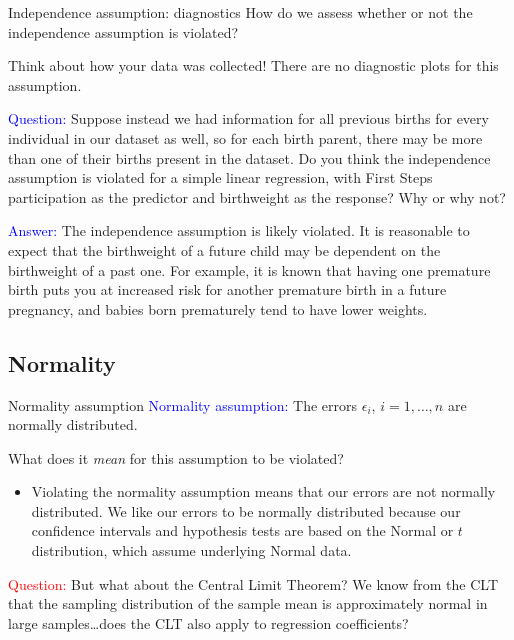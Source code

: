\documentclass[10pt,t]{beamer}
\begin{document}
\begin{frame}{Independence assumption: diagnostics}
How do we assess whether or not the independence assumption is violated?

\vspace{0.3cm}

Think about how your data was collected! There are no diagnostic plots for this assumption.

\vspace{0.3cm}

\textcolor{blue}{Question:} Suppose instead we had information for all previous births for every individual in our dataset as well, so for each birth parent, there may be more than one of their births present in the dataset. Do you think the independence assumption is violated for a simple linear regression, with First Steps participation as the predictor and birthweight as the response? Why or why not? \pause

\vspace{0.3cm}

\textcolor{blue}{Answer:} The independence assumption is likely violated. It is reasonable to expect that the birthweight of a future child may be dependent on the birthweight of a past one. For example, it is known that having one premature birth puts you at increased risk for another premature birth in a future pregnancy, and babies born prematurely tend to have lower weights. 

\end{frame}

\subsection{Normality}

\begin{frame}{Normality assumption}
\textcolor{blue}{Normality assumption:} The errors $\epsilon_i$, $i = 1, \dots, n$ are normally distributed.

\vspace{0.3cm}

What does it \textit{mean} for this assumption to be violated?

\vspace{0.3cm}

\begin{itemize}
	\item[] Violating the normality assumption means that our errors are not normally distributed. We like our errors to be normally distributed because our confidence intervals and hypothesis tests are based on the Normal or $t$ distribution, which assume underlying Normal data. \pause
\end{itemize}

\vspace{0.3cm} 
\textcolor{red}{Question:} But what about the Central Limit Theorem? We know from the CLT that the sampling distribution of the sample mean is approximately normal in large samples\dots does the CLT also apply to regression coefficients?

\end{frame}
\end{document}
